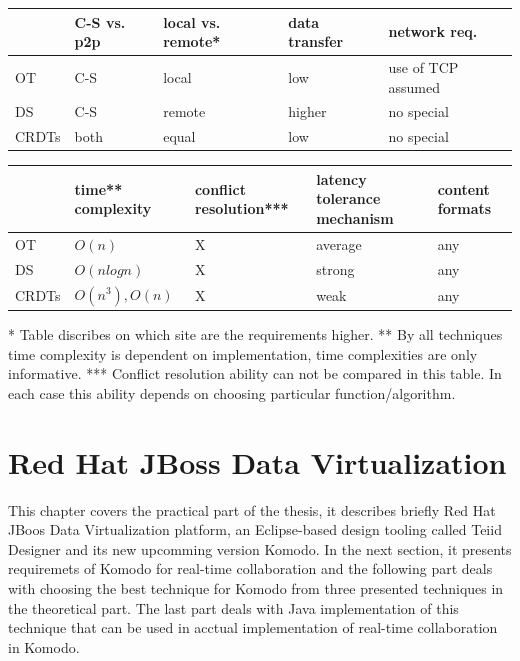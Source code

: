 \documentclass[12pt,oneside]{fithesis2}
\begin{document}
\vspace{13mm} 

\noindent
\begin{tabular}{| p{1.7cm} | p{2.2cm} | p{2.2cm} | p{2.2cm} | p{2.2cm} |}
\hline
 & C-S vs. p2p & local vs. remote* & data \newline transfer & network req.  \\
\hline
OT & C-S & local & low & use of TCP assumed \\
\hline
DS & C-S & remote & higher & no special \\
\hline
CRDTs & both & equal & low & no special \\
\hline
\end{tabular}
\newline
\vspace*{1 cm}
\newline
\begin{tabular}{| p{1.7cm} | p{2.2cm} | p{2.2cm} | p{2.2cm} | p{2.2cm} |}
\hline
 & time** \newline complexity & conflict resolution*** & latency tolerance  mechanism & content formats \\
\hline
OT &  \(O(n)\) & X & average  & any \\
\hline
DS & \(O(nlogn)\) & X & strong  & any \\
\hline
CRDTs & \(O(n^3), O(n)\) & X & weak  & any \\
\hline
\end{tabular}
\vspace{10mm}
\newline
* Table discribes on which site are the requirements higher. \newline
** By all techniques time complexity is dependent on implementation, time complexities are only informative. \newline
*** Conflict resolution ability can not be compared in this table. In each case this ability depends on choosing particular function/algorithm.
\chapter{Red Hat JBoss Data Virtualization}
\par This chapter covers the practical part of the thesis, it describes briefly Red Hat JBoos Data Virtualization platform, an Eclipse-based design tooling called Teiid Designer and its new upcomming version Komodo. In the next section, it presents requiremets of Komodo for real-time collaboration and the following part deals with choosing the best technique for Komodo from three presented techniques in the theoretical part. The last part deals with Java implementation of this technique that can be used in acctual implementation of real-time collaboration in Komodo.
\end{document}
